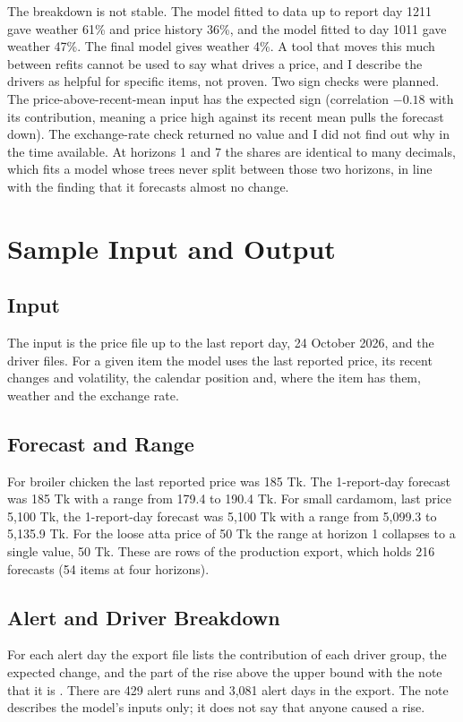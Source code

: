 The breakdown is not stable. The model fitted to data up to report day 1211 gave weather 61\% and price history 36\%, and the model fitted to day 1011 gave weather 47\%. The final model gives weather 4\%. A tool that moves this much between refits cannot be used to say what drives a price, and I describe the drivers as helpful for specific items, not proven. Two sign checks were planned. The price-above-recent-mean input has the expected sign (correlation $-0.18$ with its contribution, meaning a price high against its recent mean pulls the forecast down). The exchange-rate check returned no value and I did not find out why in the time available. At horizons 1 and 7 the shares are identical to many decimals, which fits a model whose trees never split between those two horizons, in line with the finding that it forecasts almost no change.

\section{Sample Input and Output}

\subsection{Input}
The input is the price file up to the last report day, 24 October 2026, and the driver files. For a given item the model uses the last reported price, its recent changes and volatility, the calendar position and, where the item has them, weather and the exchange rate.

\subsection{Forecast and Range}
For broiler chicken the last reported price was 185 Tk. The 1-report-day forecast was 185 Tk with a range from 179.4 to 190.4 Tk. For small cardamom, last price 5,100 Tk, the 1-report-day forecast was 5,100 Tk with a range from 5,099.3 to 5,135.9 Tk. For the loose atta price of 50 Tk the range at horizon 1 collapses to a single value, 50 Tk. These are rows of the production export, which holds 216 forecasts (54 items at four horizons).

\subsection{Alert and Driver Breakdown}
For each alert day the export file lists the contribution of each driver group, the expected change, and the part of the rise above the upper bound with the note that it is \unexpl. There are 429 alert runs and 3,081 alert days in the export. The note describes the model's inputs only; it does not say that anyone caused a rise.

